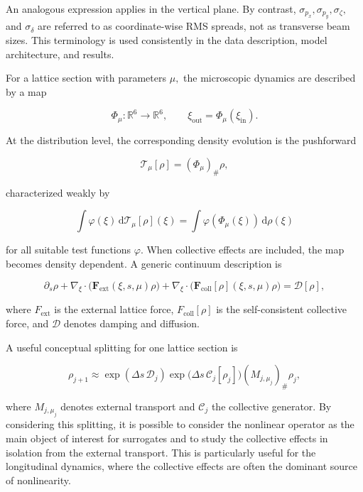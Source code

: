 An analogous expression applies in the vertical plane. By contrast, \(\sigma_{p_{x}} , \sigma_{p_{y}} , \sigma_{\zeta} ,\) and \(\sigma_{\delta}\) are referred to as coordinate-wise RMS spreads, not as transverse beam sizes. This terminology is used consistently in the data description, model architecture, and results.

For a lattice section with parameters \(\mu ,\) the microscopic dynamics are described by a map

\begin{equation}
\label{eq:29}
\Phi_{\mu}:\mathbb{R}^6\to\mathbb{R}^6,\qquad\xi_{\mathrm{out}}=\Phi_{\mu}(\xi_{\mathrm{in}}).
\end{equation}

At the distribution level, the corresponding density evolution is the pushforward

\begin{equation}
\label{eq:30}
\mathcal T_{\mu}[\rho]=(\Phi_{\mu})_{\#}\rho,
\end{equation}

characterized weakly by

\begin{equation}
\label{eq:31}
\int\varphi(\xi)\,\mathrm{d}\mathcal T_{\mu}[\rho](\xi)=\int\varphi(\Phi_{\mu}(\xi))\,\mathrm{d}\rho(\xi)
\end{equation}

for all suitable test functions \(\varphi .\) When collective effects are included, the map becomes density dependent. A generic continuum description is

\begin{equation}
\label{eq:32}
\partial_s\rho+\nabla_{\xi}\cdot\bigl(\mathbf F_{\mathrm{ext}}(\xi,s,\mu)\rho\bigr)+\nabla_{\xi}\cdot\bigl(\mathbf F_{\mathrm{coll}}[\rho](\xi,s,\mu)\rho\bigr)=\mathcal D[\rho],
\end{equation}

where \(F_{\mathrm{ext}}\) is the external lattice force, \(F_{\mathrm{coll}} [ \rho ]\) is the self-consistent collective force, and \(\mathcal{D}\) denotes damping and diffusion.

A useful conceptual splitting for one lattice section is

\begin{equation}
\label{eq:33}
\rho_{j+1}\approx\exp(\Delta s\,\mathcal D_j)\exp\bigl(\Delta s\,\mathcal C_j[\rho_j]\bigr)(M_{j,\mu_j})_{\#}\rho_j,
\end{equation}

where \(M_{j , \mu_{j}}\) denotes external transport and \(\mathcal{C}_{j}\) the collective generator. By considering this splitting, it is possible to consider the nonlinear operator as the main object of interest for surrogates and to study the collective effects in isolation from the external transport. This is particularly useful for the longitudinal dynamics, where the collective effects are often the dominant source of nonlinearity.

